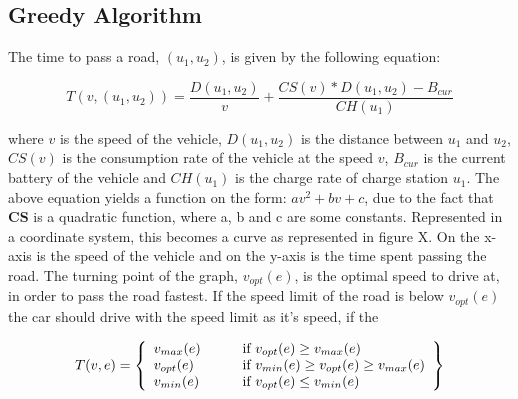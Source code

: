 \subsection{Greedy Algorithm}

The time to pass a road, $(u_1, u_2)$, is given by the following equation:

\[T(v,(u_1, u_2)) = \frac{D(u_1, u_2)}{v} + \frac{CS(v) * D(u_1, u_2) - B_{cur}}{CH(u_1)}\]

where $v$ is the speed of the vehicle, $D(u_1, u_2)$ is the distance between $u_1$ and $u_2$, 
$CS(v)$ is the consumption rate of the vehicle at the speed $v$, $B_{cur}$ is the current battery
of the vehicle and $CH(u_1)$ is the charge rate of charge station $u_1$. The above equation yields 
a function on the form: $av^2 + bv + c$, due to the fact that $\textbf{CS}$ is a quadratic function, 
where a, b and c are some constants. Represented in a coordinate system, this becomes a curve as 
represented in figure X. On the x-axis is the speed of the vehicle and on the y-axis is the time 
spent passing the road. The turning point of the graph, $v_{opt}(e)$, is the optimal speed to drive at, 
in order to pass the road fastest. If the speed limit of the road is below $v_{opt}(e)$ the car should 
drive with the speed limit as it's speed, if the  

\[ T(v, e) = \left\{ 
  \begin{array}{l l l}
    v_{max}(e) & \qquad \text{if $v_{opt}(e) \geq v_{max}(e)$}\\
    v_{opt}(e) & \qquad \text{if $v_{min}(e) \geq v_{opt}(e) \geq v_{max}(e)$}\\
    v_{min}(e) & \qquad \text{if $v_{opt}(e) \leq v_{min}(e)$}
  \end{array} \right\} \] 
